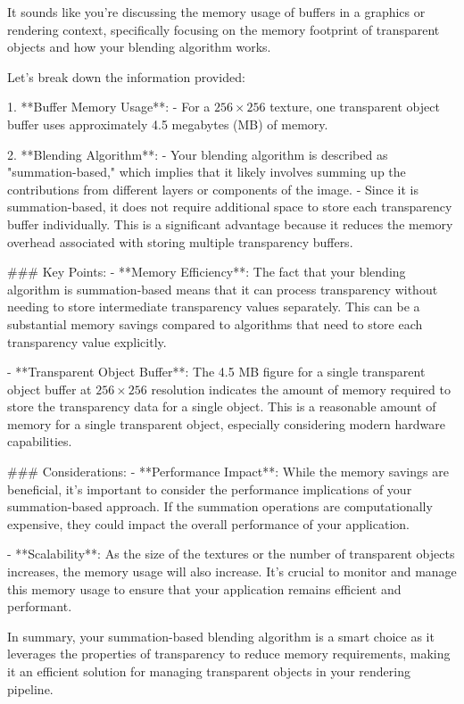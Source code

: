 It sounds like you're discussing the memory usage of buffers in a graphics or rendering context, specifically focusing on the memory footprint of transparent objects and how your blending algorithm works.

Let's break down the information provided:

1. **Buffer Memory Usage**: 
   - For a \(256 \times 256\) texture, one transparent object buffer uses approximately 4.5 megabytes (MB) of memory.
   
2. **Blending Algorithm**:
   - Your blending algorithm is described as "summation-based," which implies that it likely involves summing up the contributions from different layers or components of the image.
   - Since it is summation-based, it does not require additional space to store each transparency buffer individually. This is a significant advantage because it reduces the memory overhead associated with storing multiple transparency buffers.

### Key Points:
- **Memory Efficiency**: The fact that your blending algorithm is summation-based means that it can process transparency without needing to store intermediate transparency values separately. This can be a substantial memory savings compared to algorithms that need to store each transparency value explicitly.
  
- **Transparent Object Buffer**: The 4.5 MB figure for a single transparent object buffer at \(256 \times 256\) resolution indicates the amount of memory required to store the transparency data for a single object. This is a reasonable amount of memory for a single transparent object, especially considering modern hardware capabilities.

### Considerations:
- **Performance Impact**: While the memory savings are beneficial, it's important to consider the performance implications of your summation-based approach. If the summation operations are computationally expensive, they could impact the overall performance of your application.
  
- **Scalability**: As the size of the textures or the number of transparent objects increases, the memory usage will also increase. It's crucial to monitor and manage this memory usage to ensure that your application remains efficient and performant.

In summary, your summation-based blending algorithm is a smart choice as it leverages the properties of transparency to reduce memory requirements, making it an efficient solution for managing transparent objects in your rendering pipeline.